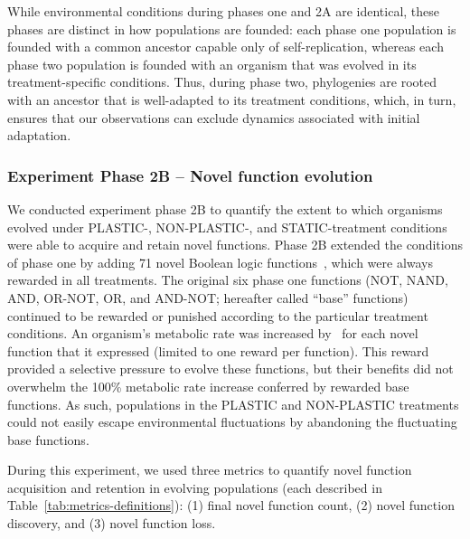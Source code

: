 \begin{raggedbottom}
While environmental conditions during phases one and 2A are identical, these phases are distinct in how populations are founded: each phase one population is founded with a common ancestor capable only of self-replication, whereas each phase two population is founded with an organism that was evolved in its treatment-specific conditions.
Thus, during phase two, phylogenies are rooted with an ancestor that is well-adapted to its treatment conditions, which, in turn, ensures that our observations can exclude dynamics associated with initial adaptation.

\subsubsection{Experiment Phase 2B -- Novel function evolution}
\label{sec:methods:exp:novel-task-evolution}

We conducted experiment phase 2B to quantify the extent to which organisms evolved under PLASTIC-, NON-PLASTIC-, and STATIC-treatment conditions were able to acquire and retain novel functions. 
Phase 2B extended the conditions of phase one by adding 71 novel Boolean logic functions~\citep{ofria_avida:_2009}, which were always rewarded in all treatments.
The original six phase one functions (NOT, NAND, AND, OR-NOT, OR, and AND-NOT; hereafter called ``base'' functions) continued to be rewarded or punished according to the particular treatment conditions.
An organism's metabolic rate was increased by \novelTraitsReward\ for each novel function that it expressed (limited to one reward per function).
This reward provided a selective pressure to evolve these functions, but their benefits did not overwhelm the 100\% metabolic rate increase conferred by rewarded base functions.
As such, populations in the PLASTIC and NON-PLASTIC treatments could not easily escape environmental fluctuations by abandoning the fluctuating base functions.

During this experiment, we used three metrics to quantify novel function acquisition and retention in evolving populations (each described in Table~\ref{tab:metrics-definitions}):
(1) final novel function count,
(2) novel function discovery,
and (3) novel function loss.


\end{raggedbottom}
